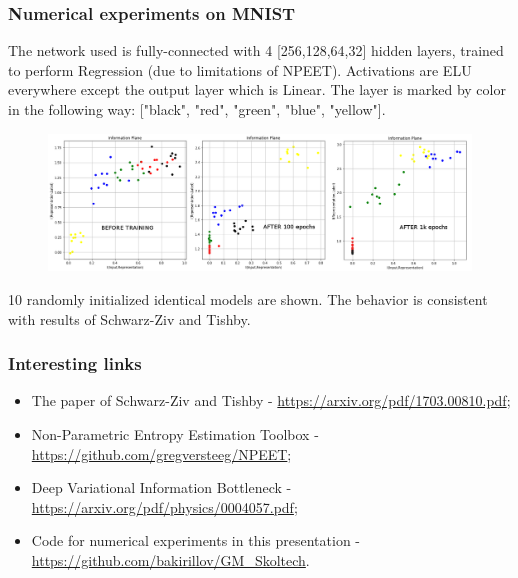 \documentclass[11pt,xcolor=x11names,compress]{beamer}
\renewcommand{\(}{\begin{columns}}
\renewcommand{\)}{\end{columns}}
\newcommand{\<}[1]{\begin{column}{#1}}
\renewcommand{\>}{\end{column}}
\begin{document}
\begin{frame}
	\frametitle{Numerical experiments on MNIST}
	\footnotesize
	The network used is fully-connected with 4 [256,128,64,32] hidden layers, trained to perform Regression (due to limitations of NPEET). Activations are ELU everywhere except the output layer which is Linear. The layer is marked by color in the following way: ["black", "red", "green", "blue", "yellow"].
	\begin{figure}
		\includegraphics[width=\textwidth]{SnapshotReproduction.png}
	\end{figure}
	10 randomly initialized identical models are shown. The behavior is consistent with results of Schwarz-Ziv and Tishby. 
\end{frame}

\begin{frame}
	\frametitle{Interesting links}
	\begin{itemize}
		\item The paper of Schwarz-Ziv and Tishby - \url{https://arxiv.org/pdf/1703.00810.pdf};
		\item Non-Parametric Entropy Estimation Toolbox - \url{https://github.com/gregversteeg/NPEET};
		\item Deep Variational Information Bottleneck - \url{https://arxiv.org/pdf/physics/0004057.pdf};
		\item Code for numerical experiments in this presentation - \url{https://github.com/bakirillov/GM_Skoltech}.
	\end{itemize}
\end{frame}
\end{document}
